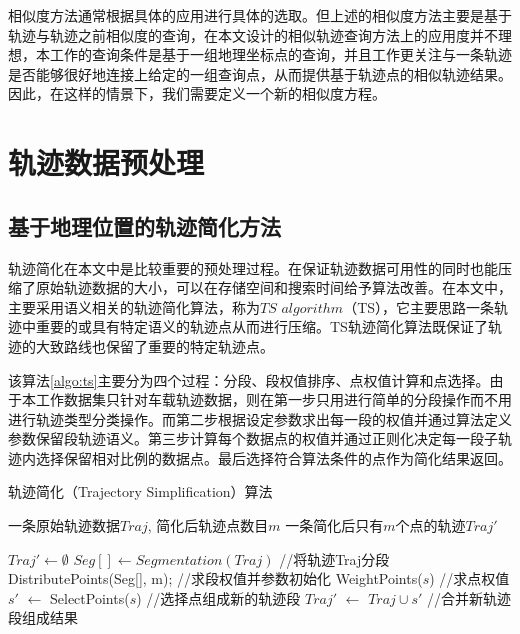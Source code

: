 相似度方法通常根据具体的应用进行具体的选取。但上述的相似度方法主要是基于轨迹与轨迹之前相似度的查询，在本文设计的相似轨迹查询方法上的应用度并不理想，本工作的查询条件是基于一组地理坐标点的查询，并且工作更关注与一条轨迹是否能够很好地连接上给定的一组查询点，从而提供基于轨迹点的相似轨迹结果。因此，在这样的情景下，我们需要定义一个新的相似度方程。
\\

\section{轨迹数据预处理}
\label{sec:preprocess}

\subsection{基于地理位置的轨迹简化方法}
\label{sec:trajectory simplification}
轨迹简化在本文中是比较重要的预处理过程。在保证轨迹数据可用性的同时也能压缩了原始轨迹数据的大小，可以在存储空间和搜索时间给予算法改善。在本文中，主要采用语义相关的轨迹简化算法，称为$TS$ $algorithm$（TS），它主要思路一条轨迹中重要的或具有特定语义的轨迹点从而进行压缩。TS轨迹简化算法既保证了轨迹的大致路线也保留了重要的特定轨迹点。

该算法\ref{algo:ts}主要分为四个过程：分段、段权值排序、点权值计算和点选择。由于本工作数据集只针对车载轨迹数据，则在第一步只用进行简单的分段操作而不用进行轨迹类型分类操作。而第二步根据设定参数求出每一段的权值并通过算法定义参数保留段轨迹语义。第三步计算每个数据点的权值并通过正则化决定每一段子轨迹内选择保留相对比例的数据点。最后选择符合算法条件的点作为简化结果返回。
\\

\begin{algorithm}
\caption{轨迹简化（Trajectory Simplification）算法}
\label{algo:ts}
\begin{algorithmic}[1] %
\Require 一条原始轨迹数据$Traj$, 简化后轨迹点数目$m$ %
\Ensure 一条简化后只有$m$个点的轨迹$Traj'$ %

\State $Traj' \gets \emptyset$
\State $Seg[] \gets Segmentation(Traj)$ //将轨迹Traj分段
\State DistributePoints(Seg[], m);	//求段权值并参数初始化
	\State WeightPoints($s$)	//求点权值
    \State $s'$ $\gets$ SelectPoints($s$)	//选择点组成新的轨迹段
    \State $Traj'$ $\gets$ $Traj \cup s'$	//合并新轨迹段组成结果
  \EndFor
\end{algorithmic}
\end{algorithm}


